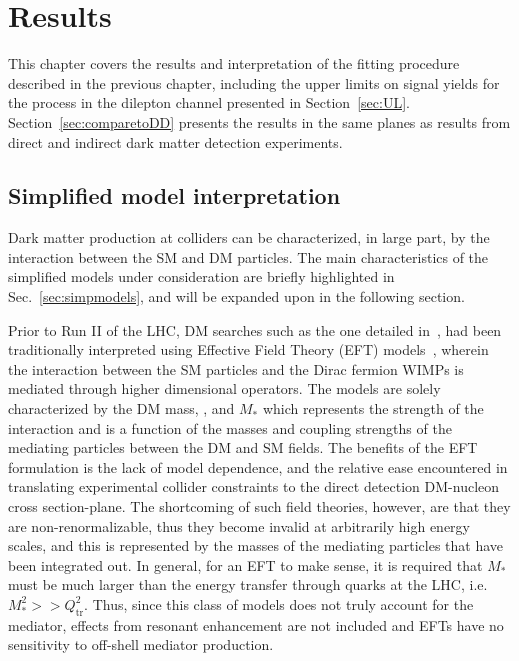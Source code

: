 \chapter{Results}
\label{chap:results}

This chapter covers the results and interpretation of the fitting procedure described in the previous chapter, including the upper limits on signal yields for the \ttDM process in the dilepton channel presented in Section~\ref{sec:UL}. Section~\ref{sec:comparetoDD} presents the results in the same planes as results from direct and indirect dark matter detection experiments. 

\section{Simplified model interpretation}
\label{sec:interpretation}
Dark matter production at colliders can be characterized, in large part, by the interaction between the SM and DM particles. The main characteristics of the simplified models under consideration are briefly highlighted in Sec.~\ref{sec:simpmodels}, and will be expanded upon in the following section.

Prior to Run II of the LHC, DM searches such as the one detailed in~\cite{Khachatryan:2016reg}, had been traditionally interpreted using Effective Field Theory (EFT) models~\cite{Goodman:2010ku}, wherein the interaction between the SM particles and the Dirac fermion WIMPs is mediated through higher dimensional operators. The models are solely characterized by the DM mass, \mDM, and $M_{*}$ which represents the strength of the interaction and is a function of the masses and coupling strengths of the mediating particles between the DM and SM fields. The benefits of the EFT formulation is the lack of model dependence, and the relative ease encountered in translating experimental collider constraints to the direct detection DM-nucleon cross section-\mDM plane. The shortcoming of such field theories, however, are that they are non-renormalizable, thus they become invalid at arbitrarily high energy scales, and this is represented by the masses of the mediating particles that have been integrated out. In general, for an EFT to make sense, it is required that $M_{*}$ must be much larger than the energy transfer through quarks at the LHC, i.e. $M_{*}^{2} >> Q_{\textrm{tr}}^{2}$. Thus, since this class of models does not truly account for the mediator, effects from resonant enhancement are not included and EFTs have no sensitivity to off-shell mediator production.

